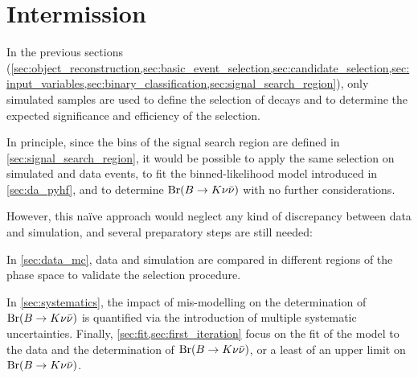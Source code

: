 \section*{Intermission}
In the previous sections (\cref{sec:object_reconstruction,sec:basic_event_selection,sec:candidate_selection,sec:input_variables,sec:binary_classification,sec:signal_search_region}), only simulated samples are used to define the selection of \BKnn decays and to determine the expected significance and efficiency of the selection.

In principle, since the bins of the signal search region are defined in \cref{sec:signal_search_region}, it would be possible to apply the same selection on simulated and data events, to fit the binned-likelihood model introduced in \cref{sec:da_pyhf}, and to determine $\mathrm{\mathrm{Br}}(B\rightarrow K\nu\bar{\nu})$ with no further considerations.

However, this na\"ive approach would neglect any kind of discrepancy between data and simulation, and several preparatory steps are still needed:
\bi
\item In \cref{sec:data_mc}, data and simulation are compared in different regions of the phase space to validate the selection procedure.
\item In \cref{sec:systematics}, the impact of mis-modelling on the determination of $\mathrm{\mathrm{Br}}(B\rightarrow K\nu\bar{\nu})$ is quantified via the introduction of multiple systematic uncertainties.
\ei
Finally, \cref{sec:fit,sec:first_iteration} focus on the fit of the model to the data and the determination of $\mathrm{\mathrm{Br}}(B\rightarrow K\nu\bar{\nu})$, or a least of an upper limit on $\mathrm{\mathrm{Br}}(B\rightarrow K\nu\bar{\nu})$.
